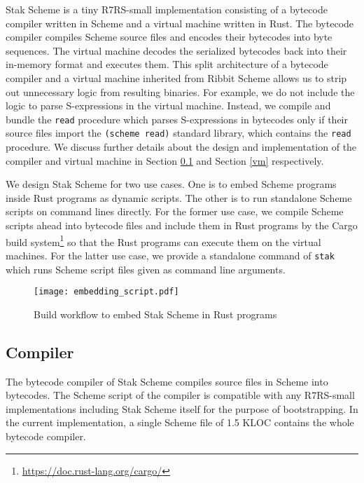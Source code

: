\documentclass[sigplan, anonymous, review]{acmart}
\begin{document}
Stak Scheme is a tiny R7RS-small implementation consisting of a
bytecode compiler written in Scheme and a virtual machine written in Rust.
The bytecode compiler compiles Scheme source files and encodes their bytecodes
into byte sequences.
The virtual machine decodes the serialized bytecodes back into their
in-memory format and executes them.
This split architecture of a bytecode compiler and a virtual machine inherited
from Ribbit Scheme allows us to strip
out unnecessary logic from resulting binaries.
For example, we do not include the logic to parse S-expressions
in the virtual machine.
Instead, we compile and bundle the \texttt{read} procedure which parses
S-expressions in bytecodes only if their source files import the
\texttt{(scheme read)} standard library, which contains the
\texttt{read} procedure.
We discuss further details about the design and implementation of the
compiler and virtual machine in Section \ref{compiler} and Section
\ref{vm} respectively.

We design Stak Scheme for two use cases. One is to embed Scheme
programs inside Rust programs as dynamic scripts.
The other is to run standalone Scheme scripts on command lines directly.
For the former use case, we
compile Scheme scripts ahead into bytecode files and include them in
Rust programs by the Cargo build
system\footnote{\url{https://doc.rust-lang.org/cargo/}} so that the
Rust programs can execute them on the virtual machines.
For the latter use case, we
provide a standalone command of \texttt{stak} which runs Scheme script
files given as command line arguments.

\begin{figure*}
  \begin{center}
    \caption{Build workflow to embed Stak Scheme in Rust programs}
    \label{figure:build}
    \texttt{[image: embedding\_script.pdf]}
  \end{center}
\end{figure*}

\subsection{Compiler} \label{compiler}

The bytecode compiler of Stak Scheme compiles source files in Scheme
into bytecodes.
The Scheme script of the compiler is compatible with any R7RS-small
implementations including Stak Scheme itself for the purpose of bootstrapping.
In the current implementation, a single Scheme file of 1.5 KLOC
contains the whole bytecode compiler.
\end{document}
